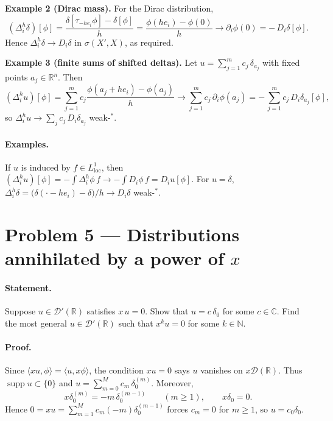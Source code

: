 \documentclass[12pt,a4paper]{article}
\theoremstyle{plain}
\theoremstyle{definition}
\theoremstyle{remark}
\theoremstyle{remark}
\begin{document}
\medskip

\textbf{Example 2 (Dirac mass).}
For the Dirac distribution,
\[
(\Delta_i^{h}\delta)[\phi]
=\frac{\delta[\tau_{-h e_i}\phi]-\delta[\phi]}{h}
=\frac{\phi(h e_i)-\phi(0)}{h}
\longrightarrow \partial_i\phi(0)
= -\,D_i\delta[\phi].
\]
Hence $\Delta_i^{h}\delta \to D_i\delta$ in $\sigma(X',X)$, as required.

\medskip

\textbf{Example 3 (finite sums of shifted deltas).}
Let $u=\sum_{j=1}^m c_j\,\delta_{a_j}$ with fixed points $a_j\in\mathbb R^n$.
Then
\[
(\Delta_i^{h}u)[\phi]
=\sum_{j=1}^m c_j\frac{\phi(a_j+h e_i)-\phi(a_j)}{h}
\longrightarrow \sum_{j=1}^m c_j\,\partial_i\phi(a_j)
= -\,\sum_{j=1}^m c_j\, D_i\delta_{a_j}[\phi],
\]
so $\Delta_i^{h}u\to \sum_j c_j\,D_i\delta_{a_j}$ weak-$^\ast$.

\bigskip
\paragraph{Examples.}

If $u$ is induced by $f\in L^1_{\mathrm{loc}}$, then
$(\Delta_i^{h}u)[\phi]=-\int \Delta_i^{h}\phi\,f\to -\int D_i\phi\,f=D_i u[\phi]$.
For $u=\delta$, $\Delta_i^{h}\delta=\big(\delta(\cdot-he_i)-\delta\big)/h\to D_i\delta$ weak-$^\ast$.

\bigskip
\bigskip

\section*{Problem 5 — Distributions annihilated by a power of $x$}

\paragraph{Statement.}
Suppose $u\in\mathcal D'(\mathbb R)$ satisfies $x\,u=0$. Show that $u=c\,\delta_0$ for some $c\in\mathbb C$.
Find the most general $u\in\mathcal D'(\mathbb R)$ such that $x^k u=0$ for some $k\in\mathbb N$.

\paragraph{Proof.}

Since $\langle x u,\phi\rangle=\langle u,x\phi\rangle$, the condition $x u=0$ says $u$ vanishes on $x\mathcal D(\mathbb R)$.
Thus $\operatorname{supp}u\subset\{0\}$ and $u=\sum_{m=0}^{M} c_m\,\delta_0^{(m)}$.
Moreover,
\[
x\delta_0^{(m)}=-m\,\delta_0^{(m-1)} \qquad (m\ge1),\qquad x\delta_0=0.
\]
Hence $0=x u=\sum_{m=1}^{M} c_m(-m)\delta_0^{(m-1)}$ forces $c_m=0$ for $m\ge1$, so $u=c_0\delta_0$.
\end{document}
